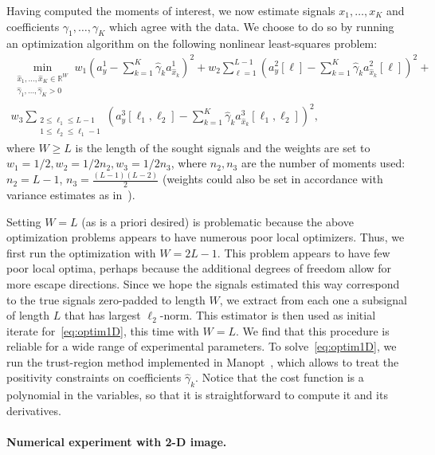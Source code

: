 \documentclass[english,11pt]{article}
\newcommand{\1}{\mathbf{1}}
\numberwithin{equation}{section}
\theoremstyle{plain}
\theoremstyle{definition}
\theoremstyle{remark}
\theoremstyle{plain}
\theoremstyle{remark}
\theoremstyle{plain}
\theoremstyle{plain}
\newcommand{\reals}{\mathbb{R}}
\begin{document}
Having computed the moments of interest, we now estimate signals $x_1, \ldots, x_K$ and coefficients $\gamma_1, \ldots, \gamma_K$ which agree with the data. We choose to do so by running an optimization algorithm on the following nonlinear least-squares problem:
\begin{multline}
\min_{\substack{\hat x_1, \ldots, \hat x_K \in \reals^{W} \\ \hat \gamma_1, \ldots, \hat \gamma_K > 0}} w_1 \left( a_y^1 - \sum_{k=1}^K \hat \gamma_k a_{\hat x_k}^1 \right)^2 + w_2 \sum_{\ell = 1}^{L-1} \left( a_y^2[\ell] - \sum_{k=1}^K \hat \gamma_k a_{\hat x_k}^2[\ell] \right)^2 + \\ w_3 \sum_{\substack{2\leq\ell_1\leq L-1 \\ 1 \leq \ell_2 \leq \ell_1-1}} \left( a_y^3[\ell_1, \ell_2] - \sum_{k=1}^K \hat \gamma_k a_{\hat x_k}^3[\ell_1,\ell_2] \right)^2,
\label{eq:optim1D}
\end{multline}
where $W \geq L$ is the length of the sought signals and the weights are set to $w_1 = 1/2, w_2 = 1/2n_2, w_3 = 1/2n_3$, where $n_2, n_3$ are the number of moments used: $n_2 = L-1$, $n_3 = \frac{(L-1)(L-2)}{2}$ (weights could also be set in accordance with variance estimates as in~\cite{boumal2017heterogeneous}).

Setting $W = L$ (as is a priori desired) is problematic because the above optimization problems appears to have numerous poor local optimizers.
Thus, we first run the optimization with $W = 2L-1$. This problem appears to have few poor local optima, perhaps because the additional degrees of freedom allow for more escape directions. Since we hope the signals estimated this way correspond to the true signals zero-padded to length $W$, we extract from each one a subsignal of length $L$ that has largest $\ell_2$-norm. This estimator is then used as initial iterate for~\eqref{eq:optim1D}, this time with $W = L$. We find that this procedure is reliable for a wide range of experimental parameters. To solve~\eqref{eq:optim1D}, we run the trust-region method implemented in Manopt~\cite{manopt}, which allows to treat the positivity constraints on coefficients $\hat \gamma_k$. Notice that the cost function is a polynomial in the variables, so that it is straightforward to compute it and its derivatives.



\paragraph{Numerical experiment with 2-D image.}
\end{document}
